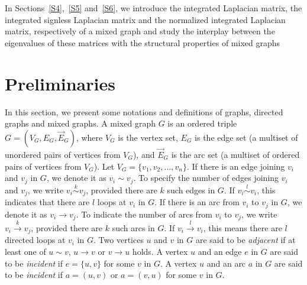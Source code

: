 \documentclass[12pt]{article}
\numberwithin{equation}{section}
\begin{document}

In Sections~\ref{S4},~\ref{S5} and~\ref{S6}, we introduce the integrated Laplacian matrix, the  integrated signless Laplacian matrix and the normalized integrated Laplacian matrix, respectively of a mixed graph and study the interplay between the eigenvalues of these matrices with the structural properties of mixed graphs


	\section{Preliminaries}\label{S2}
	In this section, we present some notations and definitions of graphs, directed graphs and mixed graphs. A mixed graph $G$ is an ordered triple $G=(V_G,E_G,\vec{E}_G)$, where $V_G$ is the vertex set, $E_G$ is the edge set (a multiset of unordered pairs of vertices from $V_G$), and $\vec{E}_G$ is the arc set (a multiset of ordered pairs of vertices from $V_G$).	Let $V_G=\{v_1,v_2,\ldots,v_n\}$. If there is an edge joining $v_i$ and $v_j$ in $G$, we denote it as $v_i \sim v_j$. To specify the number of edges joining $v_i$ and $v_j$, we write $v_i\overset{k}{\sim} v_j$, provided there are $k$ such edges in $G$. If $v_i\overset{l}{\sim} v_i$, this indicates that there are $l$ loops at $v_i$ in $G$. If there is an arc from $v_i$ to $v_j$ in $G$, we denote it as $v_i \rightarrow v_j$. To indicate the number of arcs from $v_i$ to $v_j$, we write $v_i\overset{k}{\rightarrow} v_j$, provided there are $k$ such arcs in $G$. If $v_i\overset{l}{\rightarrow} v_i$, this means there are $l$ directed loops at $v_i$ in $G$.	Two vertices $u$ and $v$ in $G$ are said to be \textit{adjacent} if at least one of $u\sim v$, $u\rightarrow v$ or $v\rightarrow u$ holds. A vertex $u$ and an edge $e$ in $G$ are said to be \textit{incident} if $e=\{u,v\}$ for some $v$ in $G$. A vertex $u$ and an arc $a$ in $G$ are said to be \textit{incident} if $a=(u,v)$ or $a=(v,u)$ for some $v$ in $G$. 
\end{document}

